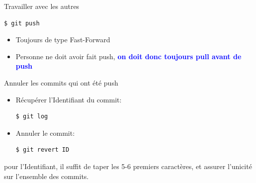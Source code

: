 \documentclass[presentation]{beamer}
\begin{document}
\begin{frame}[fragile]{Travailler avec les autres}
\begin{multicols}{2}
\begin{lstlisting}
$ git push
\end{lstlisting}
\begin{figure}%
\end{figure}
\begin{itemize}
	\item[1]<2-3> Toujours de type Fast-Forward
	\item[2]<3> Personne ne doit avoir fait push, \textbf{\textcolor{blue}{on doit donc toujours pull avant de push}}
\end{itemize}
\end{multicols}
\end{frame}

\begin{frame}[fragile]{Annuler les commits qui ont été push}
\begin{itemize}
\item[1] Récupérer l'Identifiant du commit:
\begin{lstlisting}
$ git log
\end{lstlisting}
\item[2] Annuler le commit:
\begin{lstlisting}
$ git revert ID
\end{lstlisting}
\end{itemize}
pour l'Identifiant, il suffit de taper les 5-6 premiers caractères, et assurer l'unicité sur l'ensemble des commits.
\end{frame}
\end{document}

